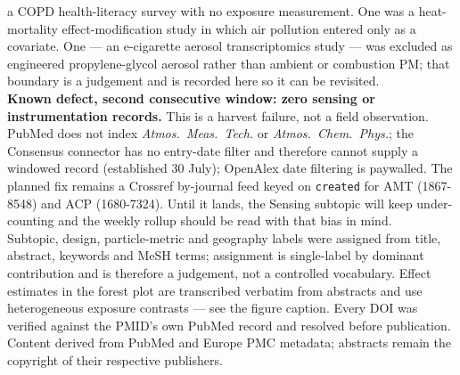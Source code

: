 \documentclass[10pt]{article}
\begin{document}
\begin{keybox}
{a COPD health-literacy survey with no exposure measurement. One was a heat-mortality
effect-modification study in which air pollution entered only as a covariate. One --- an
e-cigarette aerosol transcriptomics study --- was excluded as engineered
propylene-glycol aerosol rather than ambient or combustion PM; that boundary is a
judgement and is recorded here so it can be revisited.
\\[1.0mm]
\textbf{Known defect, second consecutive window: zero sensing or instrumentation
records.} This is a harvest failure, not a field observation. PubMed does not index
\textit{Atmos.\ Meas.\ Tech.} or \textit{Atmos.\ Chem.\ Phys.}; the Consensus connector
has no entry-date filter and therefore cannot supply a windowed record (established
30 July); OpenAlex date filtering is paywalled. The planned fix remains a Crossref
by-journal feed keyed on \texttt{created} for AMT (1867-8548) and ACP (1680-7324). Until
it lands, the Sensing subtopic will keep under-counting and the weekly rollup should be
read with that bias in mind.
\\[1.0mm]
Subtopic, design, particle-metric and geography labels were assigned from title,
abstract, keywords and MeSH terms; assignment is single-label by dominant contribution
and is therefore a judgement, not a controlled vocabulary. Effect estimates in the forest
plot are transcribed verbatim from abstracts and use heterogeneous exposure contrasts ---
see the figure caption. Every DOI was verified against the PMID's own PubMed record and
resolved before publication. Content derived from PubMed and Europe PMC metadata;
abstracts remain the copyright of their respective publishers.\par}
\end{keybox}
\end{document}
